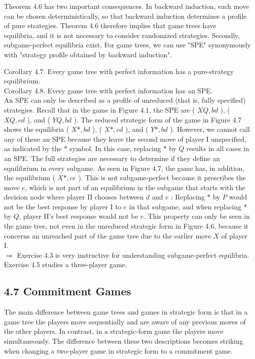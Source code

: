 \documentclass[12pt]{article}
\begin{document}
Theorem 4.6 has two important consequences. In backward induction, each move can be chosen deterministically, so that backward induction determines a profile of pure strategies. Theorem 4.6 therefore implies that game trees have\\
equilibria, and it is not necessary to consider randomized strategies. Secondly, subgame-perfect equilibria exist. For game trees, we can use "SPE" synonymously with "strategy profile obtained by backward induction".

Corollary 4.7. Every game tree with perfect information has a pure-strategy equilibrium.\\
Corollary 4.8. Every game tree with perfect information has an SPE.\\
An SPE can only be described as a profile of unreduced (that is, fully specified) strategies. Recall that in the game in Figure 4.1, the SPE are ( $X Q, b d$ ), ( $X Q, c d$ ), and ( $Y Q, b d$ ). The reduced strategic form of the game in Figure 4.7 shows the equilibria ( $X *, b d$ ), ( $X *, c d$ ), and ( $Y *, b d$ ). However, we cannot call any of these an SPE because they leave the second move of player I unspecified, as indicated by the * symbol. In this case, replacing * by $Q$ results in all cases in an SPE. The full strategies are necessary to determine if they define an equilibrium in every subgame. As seen in Figure 4.7, the game has, in addition, the equilibrium ( $X *, c e$ ). This is not subgame-perfect because it prescribes the move $e$, which is not part of an equilibrium in the subgame that starts with the decision node where player II chooses between $d$ and $e$ : Replacing * by $P$ would not be the best response by player I to $e$ in that subgame, and when replacing * by $Q$, player II's best response would not be $e$. This property can only be seen in the game tree, not even in the unreduced strategic form in Figure 4.6, because it concerns an unreached part of the game tree due to the earlier move $X$ of player I.\\
$\Rightarrow$ Exercise 4.3 is very instructive for understanding subgame-perfect equilibria.\\
Exercise 4.5 studies a three-player game.

\subsection*{4.7 Commitment Games}
The main difference between game trees and games in strategic form is that in a game tree the players move sequentially and are aware of any previous moves of the other players. In contrast, in a strategic-form game the players move simultaneously. The difference between these two descriptions becomes striking when changing a two-player game in strategic form to a commitment game.
\end{document}
